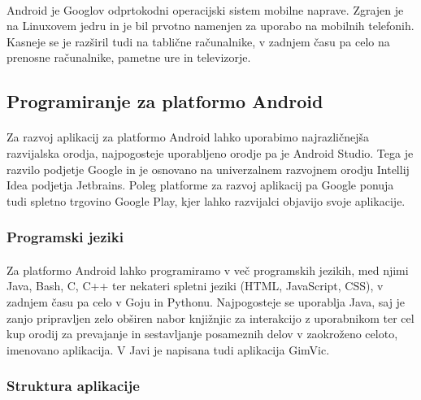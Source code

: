 \paragraph{}Android je Googlov odprtokodni\cite{android-source} operacijski sistem mobilne naprave. Zgrajen je na Linuxovem jedru\cite{linux-kernel-wiki} in je bil prvotno namenjen za uporabo na mobilnih telefonih. Kasneje se je razširil tudi na tablične računalnike, v zadnjem času pa celo na prenosne računalnike, pametne ure in televizorje.

\subsection{Programiranje za platformo Android}
\paragraph{}Za razvoj aplikacij za platformo Android lahko uporabimo najrazličnejša razvijalska orodja, najpogosteje uporabljeno orodje pa je Android Studio. Tega je razvilo podjetje Google in je osnovano na univerzalnem razvojnem orodju Intellij Idea\cite{intellij-idea} podjetja Jetbrains. Poleg platforme za razvoj aplikacij pa Google ponuja tudi spletno trgovino Google Play, kjer lahko razvijalci objavijo svoje aplikacije.

\subsubsection{Programski jeziki}
\paragraph{}Za platformo Android lahko programiramo v več programskih jezikih, med njimi Java, Bash, C, C++ ter nekateri spletni jeziki (HTML, JavaScript, CSS), v zadnjem času pa celo v Goju in Pythonu. Najpogosteje se uporablja Java, saj je zanjo pripravljen zelo obširen nabor knjižnjic za interakcijo z uporabnikom ter cel kup orodij za prevajanje in sestavljanje posameznih delov v zaokroženo celoto, imenovano aplikacija. V Javi je napisana tudi aplikacija GimVic.

\subsubsection{Struktura aplikacije}
